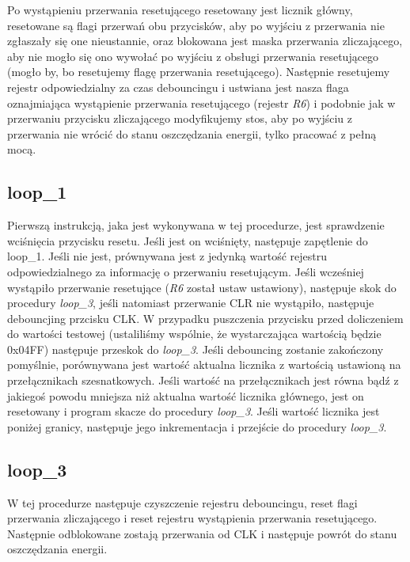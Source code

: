 \documentclass[fleqn]{article}
\begin{document}
		Po wystąpieniu przerwania resetującego resetowany jest licznik główny, resetowane są flagi przerwań obu przycisków, aby po wyjściu z przerwania nie zgłaszały się one nieustannie, oraz blokowana jest maska przerwania zliczającego, aby nie mogło się ono wywołać po wyjściu z obsługi przerwania resetującego (mogło by, bo resetujemy flagę przerwania resetującego). Następnie resetujemy rejestr odpowiedzialny za czas debouncingu i ustwiana jest nasza flaga oznajmiająca wystąpienie przerwania resetującego (rejestr \textit{R6}) i podobnie jak w przerwaniu przycisku zliczającego modyfikujemy stos, aby po wyjściu z przerwania nie wrócić do stanu oszczędzania energii, tylko pracować z pełną mocą.

\subsection{loop\_1}
		Pierwszą instrukcją, jaka jest wykonywana w tej procedurze, jest sprawdzenie wciśnięcia przycisku resetu. Jeśli jest on wciśnięty, następuje zapętlenie do loop\_1. Jeśli nie jest, prównywana jest z jedynką wartość rejestru odpowiedzialnego za informację o przerwaniu resetującym. Jeśli wcześniej wystąpiło przerwanie resetujące (\textit{R6} został ustaw ustawiony), następuje skok do procedury \textit{loop\_3}, jeśli natomiast przerwanie CLR nie wystąpiło, następuje debouncjing przcisku CLK. W przypadku puszczenia przycisku przed doliczeniem do wartości testowej (ustaliliśmy wspólnie, że wystarczająca wartością będzie 0x04FF) następuje przeskok do \textit{loop\_3}. Jeśli debouncing zostanie zakończony pomyślnie, porównywana jest wartość aktualna licznika z wartością ustawioną na przełącznikach szesnatkowych. Jeśli wartość na przełącznikach jest równa bądź z jakiegoś powodu mniejsza niż aktualna wartość licznika głównego, jest on resetowany i program skacze do procedury \textit{loop\_3}. Jeśli wartość licznika jest poniżej granicy, następuje jego inkrementacja i przejście do procedury \textit{loop\_3}.

\subsection{loop\_3}

		W tej procedurze następuje czyszczenie rejestru debouncingu, reset flagi przerwania zliczającego i reset rejestru wystąpienia przerwania resetującego. Następnie odblokowane zostają przerwania od CLK i następuje powrót do stanu oszczędzania energii.
\end{document}
